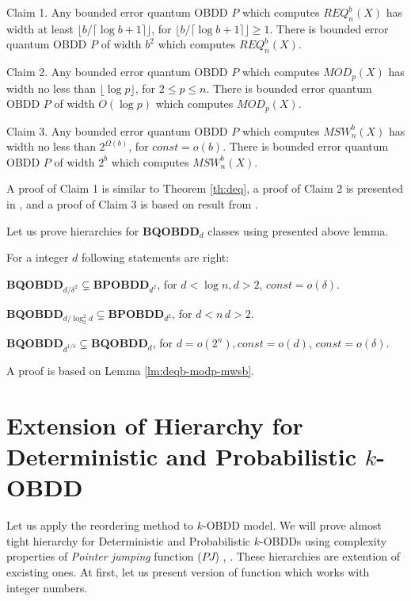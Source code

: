 \documentclass{llncs}
\begin{document}
\begin{lemma}\label{lm:deqb-modp-mwsb}
Claim 1.
Any bounded error quantum OBDD $P$ which computes $REQ_n^b(X)$ has width at least $\lfloor b/\lceil \log b + 1\rceil \rfloor$, for $\lfloor b/\lceil \log b + 1\rceil \rfloor\geq 1$. 
There is  bounded error quantum OBDD $P$ of width $b^2$ which computes $REQ_n^b(X)$.  

Claim 2.
Any bounded error quantum OBDD $P$ which computes $MOD_p(X)$ has width no less than $\lfloor \log p \rfloor$, for $2\leq p \leq n$. 
There is  bounded error quantum OBDD $P$ of width $O(\log p)$ which computes $MOD_p(X)$.  

Claim 3.
Any bounded error quantum OBDD $P$ which computes $MSW_n^b(X)$ has width no less than $2^{\Omega(b)}$, for $const=o(b)$. 
There is  bounded error quantum OBDD $P$ of width $2^b$ which computes $MSW_n^b(X)$.  
\end{lemma}

A proof of Claim 1 is similar to Theorem \ref{th:deq}, a proof of Claim 2 is presented in \cite{agkmp2005}, \cite{av2008} and a proof of Claim 3 is based on result from \cite{s06}.



  Let us prove hierarchies for {\bf BQOBDD}$_d$ classes using presented above lemma.

\begin{theorem} \label{th:quntum-hi} For a integer $d$ following statements are right:

{\bf BQOBDD}$_{d/\delta^2}\subsetneq${\bf BPOBDD}$_{d^2}$, for $d<\log n, d>2$,   $const=o(\delta)$.

{\bf BQOBDD}$_{d/\log^2_2 d}\subsetneq${\bf BPOBDD}$_{d^2}$, for $d<n\, d>2$.

{\bf BQOBDD}$_{d^{1/\delta}}\subsetneq${\bf BQOBDD}$_d$, for $d=o(2^n), const = o(d)$, $const=o(\delta)$.
\end{theorem}
A proof is based on Lemma \ref{lm:deqb-modp-mwsb}. 

\section{Extension of Hierarchy for Deterministic and Probabilistic $k$-OBDD}\label{sec:kobdd-hrch}

Let us apply the reordering method to $k$-OBDD model. We will prove almost tight hierarchy for Deterministic and Probabilistic $k$-OBDDs using complexity properties of {\em Pointer jumping} function ($PJ$) \cite{nw91}, \cite{bssw96}. These hierarchies are  extention of excisting ones. At first, let us present version of function which works with integer numbers.
\end{document}
